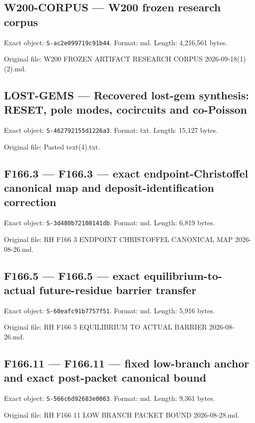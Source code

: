 \documentclass[
  10pt,
  a4paper,
  10pt,
  oneside,
  openany]{book}
\begin{document}
\subsection{W200-CORPUS --- W200 frozen research
corpus}\label{source-w200-corpus}

Exact object: \texttt{S-ac2e099719c91b44}. Format: md. Length: 4,216,561
bytes.

Original file: W200 FROZEN ARTIFACT RESEARCH CORPUS 2026-09-18(1)(2).md.

\subsection{LOST-GEMS --- Recovered lost-gem synthesis: RESET, pole
modes, cocircuits and co-Poisson}\label{source-lost-gems}

Exact object: \texttt{S-462792155d1226a3}. Format: txt. Length: 15,127
bytes.

Original file: Pasted text(4).txt.

\subsection{F166.3 --- F166.3 --- exact endpoint-Christoffel canonical
map and deposit-identification correction}\label{source-f166-3}

Exact object: \texttt{S-3d480b72108141db}. Format: md. Length: 6,819
bytes.

Original file: RH F166 3 ENDPOINT CHRISTOFFEL CANONICAL MAP
2026-08-26.md.

\subsection{F166.5 --- F166.5 --- exact equilibrium-to-actual
future-residue barrier transfer}\label{source-f166-5}

Exact object: \texttt{S-60eafc91b7757f51}. Format: md. Length: 5,916
bytes.

Original file: RH F166 5 EQUILIBRIUM TO ACTUAL BARRIER 2026-08-26.md.

\subsection{F166.11 --- F166.11 --- fixed low-branch anchor and exact
post-packet canonical bound}\label{source-f166-11}

Exact object: \texttt{S-566c6d92683e0063}. Format: md. Length: 9,361
bytes.

Original file: RH F166 11 LOW BRANCH PACKET BOUND 2026-08-28.md.
\end{document}
